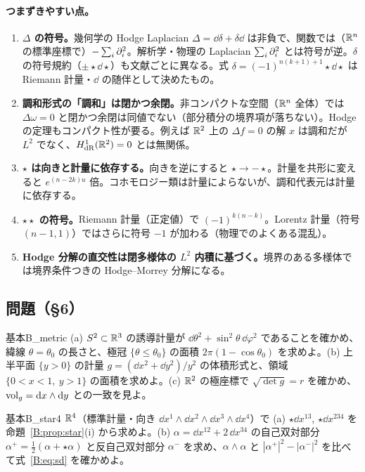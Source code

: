 \paragraph{つまずきやすい点。}
\begin{enumerate}
\item \textbf{$\Delta$ の符号。}幾何学の Hodge Laplacian $\Delta=\dd\delta+\delta\dd$ は非負で、関数では（$\mathbb R^n$ の標準座標で）$-\sum_i\partial_i^2$。解析学・物理の Laplacian $\sum_i\partial_i^2$ とは符号が逆。$\delta$ の符号規約（$\pm\star\dd\star$）も文献ごとに異なる。式 $\delta=(-1)^{n(k+1)+1}\star\dd\star$ は Riemann 計量・$\dd$ の随伴として決めたもの。
\item \textbf{調和形式の「調和」は閉かつ余閉。}非コンパクトな空間（$\mathbb R^n$ 全体）では $\Delta\omega=0$ と閉かつ余閉は同値でない（部分積分の境界項が落ちない）。Hodge の定理もコンパクト性が要る。例えば $\mathbb R^2$ 上の $\Delta f=0$ の解 $x$ は調和だが $L^2$ でなく、$H^1_{\rm dR}(\mathbb R^2)=0$ とは無関係。
\item \textbf{$\star$ は向きと計量に依存する。}向きを逆にすると $\star\to-\star$。計量を共形に変えると $e^{(n-2k)u}$ 倍。コホモロジー類は計量によらないが、調和代表元は計量に依存する。
\item \textbf{$\star\star$ の符号。}Riemann 計量（正定値）で $(-1)^{k(n-k)}$。Lorentz 計量（符号 $(n-1,1)$）ではさらに符号 $-1$ が加わる（物理でのよくある混乱）。
\item \textbf{Hodge 分解の直交性は閉多様体の $L^2$ 内積に基づく。}境界のある多様体では境界条件つきの Hodge--Morrey 分解になる\tC。
\end{enumerate}

\subsection*{問題（§6）}

\begin{probl}{基本}{B_metric}
(a) $S^2\subset\mathbb R^3$ の誘導計量が $\dd\theta^2+\sin^2\theta\,\dd\varphi^2$ であることを確かめ、緯線 $\theta=\theta_0$ の長さと、極冠 $\{\theta\le\theta_0\}$ の面積 $2\pi(1-\cos\theta_0)$ を求めよ。(b) 上半平面 $\{y>0\}$ の計量 $g=(\dd x^2+\dd y^2)/y^2$ の体積形式と、領域 $\{0<x<1,\ y>1\}$ の面積を求めよ。(c) $\mathbb R^2$ の極座標で $\sqrt{\det g}=r$ を確かめ、$\mathrm{vol}_g=\mathrm{d} x\wedge\mathrm{d} y$ との一致を見よ。
\end{probl}


\begin{probl}{基本}{B_star4}
$\mathbb R^4$（標準計量・向き $\dd x^1\wedge\dd x^2\wedge\dd x^3\wedge\dd x^4$）で (a) $\star\dd x^{13}$, $\star\dd x^{234}$ を命題~\ref{B:prop:star}(i) から求めよ。(b) $\alpha=\dd x^{12}+2\,\dd x^{34}$ の自己双対部分 $\alpha^+=\frac12(\alpha+\star\alpha)$ と反自己双対部分 $\alpha^-$ を求め、$\alpha\wedge\alpha$ と $|\alpha^+|^2-|\alpha^-|^2$ を比べて式~\eqref{B:eq:sd} を確かめよ。
\end{probl}

